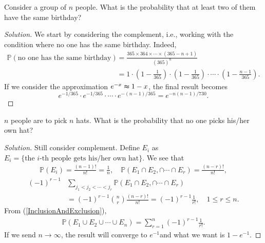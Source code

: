 \documentclass[11pt,singlecolumn, openany, citestyle=authoryear]{elegantbook}
\begin{document}
\begin{CJK}{UTF8}{gbsn}
\begin{example}
    Consider a group of $n$ people. What is the probability that at least two of 
    them have the same birthday?
\end{example}
\begin{proof}[Solution]
    We start by considering the complement, i.e., working with the condition where 
    no one has the same birthday.
    Indeed, 
    \begin{align*}
        \mathbb{P}(\text{no one has the same birthday}) &= 
        \frac{365 \times 364 \times \cdots \times (365-n+1)}{(365)^n} \\
        &= 1 \cdot (1-\frac{1}{365}) \cdot (1-\frac{1}{365}) \cdot \cdots 
        \cdot  (1-\frac{n-1}{365}).
    \end{align*}
    If we consider the approximation $e^{-x}\thickapprox 1-x$, the final result 
    becomes 
    $$
    e^{-1/365}\cdot e^{-1/365} \cdot \cdots \cdot e^{-(n-1)/365} = 
    e^{-n(n-1)/730}.
    $$
\end{proof}

\begin{example}
    $n$ people are to pick $n$ hats. What is the probability that 
    no one picks his/her own hat?
\end{example}
\begin{proof}[Solution]
    Still consider complement. Define $E_i$ as 
    $E_i = \{\text{the } i \text{-th people gets his/her own hat}\}$. We see that 
    \begin{gather*}
    \mathbb{P}(E_i) = \frac{(n-1)!}{n!} = \frac{1}{n}, \quad 
    \mathbb{P}(E_1\cap E_2,\cap \cdots \cap E_r) = \frac{(n-r)!}{n!},
    \end{gather*}
    \begin{align*}
    (-1)^{r-1}&\sum_{j_1 < j_2< \cdots <j_r} \mathbb{P}(E_1\cap E_2,\cap \cdots \cap E_r)\\
    &= (-1)^{r-1} \binom{n}{r} \frac{(n-r)!}{n!}
    =(-1)^{r-1}\frac{1}{r!}, 
    \quad 1 \leqslant r 
    \leqslant n.
    \end{align*}
    From (\ref{InclusionAndExclusion}), 
    \begin{align*}
        \mathbb{P}(E_1 \cup E_2 \cup \cdots \cup E_n) = \sum_{r=1}^n (-1)^{r-1}\frac{1}{r!}.  
    \end{align*}
    If we send $n \to \infty$, the result will converge to $e^{-1}$and what we want is 
    $1-e^{-1}$.
\end{proof}


\end{CJK}
\end{document}
